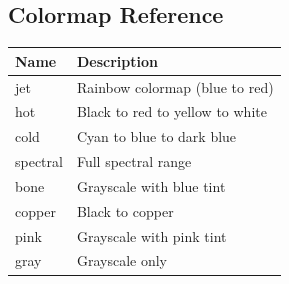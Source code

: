 \documentclass[11pt,a4paper]{article}
\begin{document}
\subsection{Colormap Reference}

\begin{tabular}{ll}
\toprule
\textbf{Name} & \textbf{Description} \\
\midrule
jet & Rainbow colormap (blue to red) \\
hot & Black to red to yellow to white \\
cold & Cyan to blue to dark blue \\
spectral & Full spectral range \\
bone & Grayscale with blue tint \\
copper & Black to copper \\
pink & Grayscale with pink tint \\
gray & Grayscale only \\
\bottomrule
\end{tabular}
\end{document}
